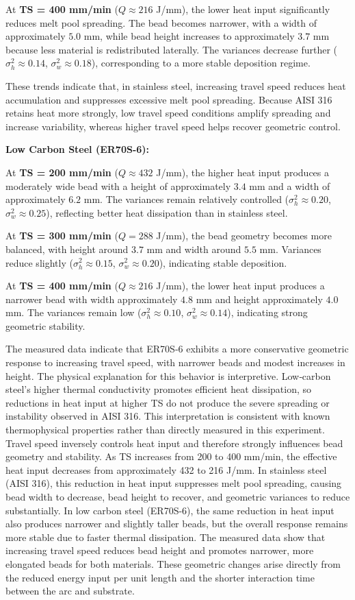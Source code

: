 \documentclass[conference]{IEEEtran}
\begin{document}
At \textbf{TS = 400 mm/min} ($Q \approx 216$ J/mm), the lower heat input significantly reduces melt pool spreading. The bead becomes narrower, with a width of approximately $5.0$ mm, while bead height increases to approximately $3.7$ mm because less material is redistributed laterally. The variances decrease further ($\sigma_h^2 \approx 0.14$, $\sigma_w^2 \approx 0.18$), corresponding to a more stable deposition regime.

These trends indicate that, in stainless steel, increasing travel speed reduces heat accumulation and suppresses excessive melt pool spreading. Because AISI 316 retains heat more strongly, low travel speed conditions amplify spreading and increase variability, whereas higher travel speed helps recover geometric control.

\textbf{Low Carbon Steel (ER70S-6):}

At \textbf{TS = 200 mm/min} ($Q \approx 432$ J/mm), the higher heat input produces a moderately wide bead with a height of approximately $3.4$ mm and a width of approximately $6.2$ mm. The variances remain relatively controlled ($\sigma_h^2 \approx 0.20$, $\sigma_w^2 \approx 0.25$), reflecting better heat dissipation than in stainless steel.

At \textbf{TS = 300 mm/min} ($Q = 288$ J/mm), the bead geometry becomes more balanced, with height around $3.7$ mm and width around $5.5$ mm. Variances reduce slightly ($\sigma_h^2 \approx 0.15$, $\sigma_w^2 \approx 0.20$), indicating stable deposition.

At \textbf{TS = 400 mm/min} ($Q \approx 216$ J/mm), the lower heat input produces a narrower bead with width approximately $4.8$ mm and height approximately $4.0$ mm. The variances remain low ($\sigma_h^2 \approx 0.10$, $\sigma_w^2 \approx 0.14$), indicating strong geometric stability.

The measured data indicate that ER70S‑6 exhibits a more conservative geometric response to increasing travel speed, with narrower beads and modest increases in height. The physical explanation for this behavior is interpretive. Low‑carbon steel’s higher thermal conductivity promotes efficient heat dissipation, so reductions in heat input at higher TS do not produce the severe spreading or instability observed in AISI 316. This interpretation is consistent with known thermophysical properties rather than directly measured in this experiment. Travel speed inversely controls heat input and therefore strongly influences bead geometry and stability. As TS increases from 200 to 400 mm/min, the effective heat input decreases from approximately 432 to 216 J/mm. In stainless steel (AISI 316), this reduction in heat input suppresses melt pool spreading, causing bead width to decrease, bead height to recover, and geometric variances to reduce substantially. In low carbon steel (ER70S-6), the same reduction in heat input also produces narrower and slightly taller beads, but the overall response remains more stable due to faster thermal dissipation.
The measured data show that increasing travel speed reduces bead height and promotes narrower, more elongated beads for both materials. These geometric changes arise directly from the reduced energy input per unit length and the shorter interaction time between the arc and substrate.
\end{document}
